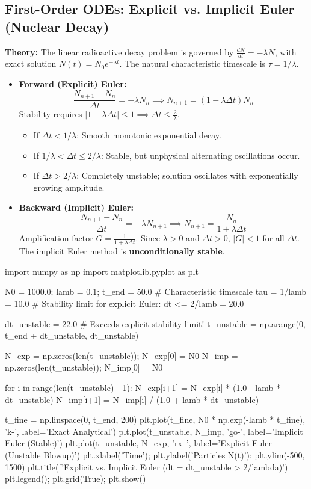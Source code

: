 \documentclass{article}
\begin{document}
\subsection{First-Order ODEs: Explicit vs. Implicit Euler (Nuclear Decay)}
\textbf{Theory:} The linear radioactive decay problem is governed by $\frac{dN}{dt} = -\lambda N$, with exact solution $N(t) = N_0 e^{-\lambda t}$. The natural characteristic timescale is $\tau = 1/\lambda$.
\begin{itemize}
    \item \textbf{Forward (Explicit) Euler:}
    $$\frac{N_{n+1} - N_n}{\Delta t} = -\lambda N_n \implies N_{n+1} = (1 - \lambda \Delta t) N_n$$
    Stability requires $|1 - \lambda \Delta t| \le 1 \implies \Delta t \le \frac{2}{\lambda}$.
    \begin{itemize}
        \item If $\Delta t < 1/\lambda$: Smooth monotonic exponential decay.
        \item If $1/\lambda < \Delta t \le 2/\lambda$: Stable, but unphysical alternating oscillations occur.
        \item If $\Delta t > 2/\lambda$: Completely unstable; solution oscillates with exponentially growing amplitude.
    \end{itemize}
    \item \textbf{Backward (Implicit) Euler:}
    $$\frac{N_{n+1} - N_n}{\Delta t} = -\lambda N_{n+1} \implies N_{n+1} = \frac{N_n}{1 + \lambda \Delta t}$$
    Amplification factor $G = \frac{1}{1 + \lambda \Delta t}$. Since $\lambda > 0$ and $\Delta t > 0$, $|G| < 1$ for all $\Delta t$.
    The implicit Euler method is \textbf{unconditionally stable}.
\end{itemize}

\begin{jupytercode}
import numpy as np
import matplotlib.pyplot as plt

N0 = 1000.0; lamb = 0.1; t_end = 50.0
# Characteristic timescale tau = 1/lamb = 10.0
# Stability limit for explicit Euler: dt <= 2/lamb = 20.0

dt_unstable = 22.0  # Exceeds explicit stability limit!
t_unstable = np.arange(0, t_end + dt_unstable, dt_unstable)

N_exp = np.zeros(len(t_unstable)); N_exp[0] = N0
N_imp = np.zeros(len(t_unstable)); N_imp[0] = N0

for i in range(len(t_unstable) - 1):
    N_exp[i+1] = N_exp[i] * (1.0 - lamb * dt_unstable)
    N_imp[i+1] = N_imp[i] / (1.0 + lamb * dt_unstable)

t_fine = np.linspace(0, t_end, 200)
plt.plot(t_fine, N0 * np.exp(-lamb * t_fine), 'k-', label='Exact Analytical')
plt.plot(t_unstable, N_imp, 'go-', label='Implicit Euler (Stable)')
plt.plot(t_unstable, N_exp, 'rx--', label='Explicit Euler (Unstable Blowup)')
plt.xlabel('Time'); plt.ylabel('Particles N(t)'); plt.ylim(-500, 1500)
plt.title(f'Explicit vs. Implicit Euler (dt = {dt_unstable} > 2/lambda)')
plt.legend(); plt.grid(True); plt.show()
\end{jupytercode}
\newpage
\end{document}
